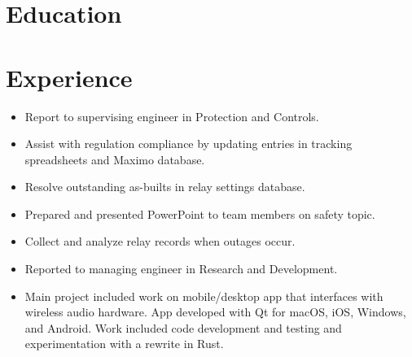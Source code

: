 \documentclass{lsanche_cv}
\begin{document}

\medskip


\smallskip


\begin{multicols*}{2}
  \section{Education}

  \section{Experience}
    \begin{itemize}
      \item Report to supervising engineer in Protection and Controls.
			\item Assist with regulation compliance by updating entries in tracking spreadsheets and Maximo database.
			\item Resolve outstanding as-builts in relay settings database.
			\item Prepared and presented PowerPoint to team members on safety topic.
			\item Collect and analyze relay records when outages occur.
    \end{itemize}

	\divider

    \begin{itemize}
      \item Reported to managing engineer in Research and Development.
	  \item Main project included work on mobile/desktop app that interfaces with wireless audio hardware. App developed with Qt for macOS, iOS, Windows, and Android. Work included code development and testing and experimentation with a rewrite in Rust.
    \end{itemize}


\end{multicols*}
\end{document}
